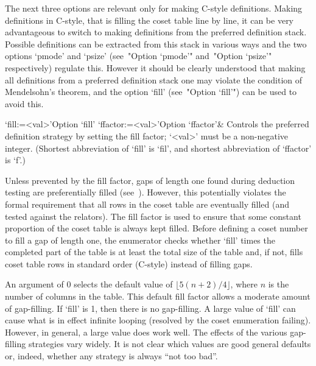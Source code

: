 \enditems


The  next  three  options  are  relevant  only  for   making   C-style
definitions. Making definitions in C-style, that is filling the  coset
table line by line, it can be very advantageous to  switch  to  making
definitions from the preferred definition stack. Possible  definitions
can be extracted from this stack in various ways and the  two  options
`pmode'  and  `psize'  (see~"Option  `pmode'"   and~"Option   `psize'"
respectively) regulate this. However it should be  clearly  understood
that making all definitions from a preferred definition stack one  may
violate the condition of Mendelsohn's theorem, and the  option  `fill'
(see~"Option `fill'") can be used to avoid this.

\beginitems

\>`fill:=<val>'{Option `fill'}
\>`ffactor:=<val>'{Option `ffactor'}&
Controls the preferred definition strategy by setting the fill factor;
`<val>' must be a non-negative integer.
(Shortest abbreviation of `fill' is `fil', and  shortest  abbreviation
of `ffactor' is `f'.)

Unless prevented by the fill factor, gaps of length one  found  during
deduction  testing  are  preferentially   filled   (see~\cite{Hav91}).
However, this potentially violates the  formal  requirement  that  all
rows in the coset table are eventually filled (and tested against  the
relators). The fill factor  is  used  to  ensure  that  some  constant
proportion of the coset table is always kept filled. Before defining a
coset number to fill a  gap  of  length  one,  the  enumerator  checks
whether `fill' times the completed part of the table is at  least  the
total size of the table  and,  if  not,  fills  coset  table  rows  in
standard order (C-style) instead of filling gaps.

An  argument of  0  selects  the default  value  of $\lfloor  5(n+2)/4
\rfloor$,  where $n$  is the  number of  columns in  the  table.  This
default  fill factor  allows  a moderate  amount  of gap-filling.   If
`fill' is  1, then there is  no gap-filling.  A large  value of `fill'
can cause  what is in effect  infinite looping (resolved  by the coset
enumeration failing).   However, in general,  a large value  does work
well.  The  effects of the various gap-filling  strategies vary widely.
It is  not clear  which values are  good general defaults  or, indeed,
whether any strategy is always ``not too bad''.

